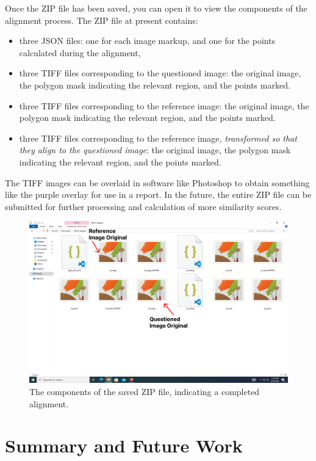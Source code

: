 \documentclass{csafedoc}
\begin{document}
Once the ZIP file has been saved, you can open it to view the components of the alignment
process. The ZIP file at present contains:

\begin{itemize}
	\item three JSON files: one for each image markup, and one for the points calculated
	      during the alignment,
	\item three TIFF files corresponding to the questioned image: the original image, the
	      polygon mask indicating the relevant region, and the points marked.
	\item three TIFF files corresponding to the reference image: the original image, the
	      polygon mask indicating the relevant region, and the points marked.
	\item three TIFF files corresponding to the reference image, \textit{transformed so
		      that they align to the questioned image}: the original image, the
	      polygon mask indicating the relevant region, and the points marked.
\end{itemize}

The TIFF images can be overlaid in software like Photoshop to obtain something like the
purple overlay for use in a report. In the future, the entire ZIP file can be submitted
for further processing and calculation of more similarity scores.

\begin{figure}[H]
	\begin{center}
		\includegraphics[width=0.8\linewidth]{images/step_10-anno.png}
	\end{center}
	\caption{The components of the saved ZIP file, indicating a completed alignment.}
	\label{fig:step10}
\end{figure}

\newpage
\chapter{Summary and Future Work}%
\end{document}
